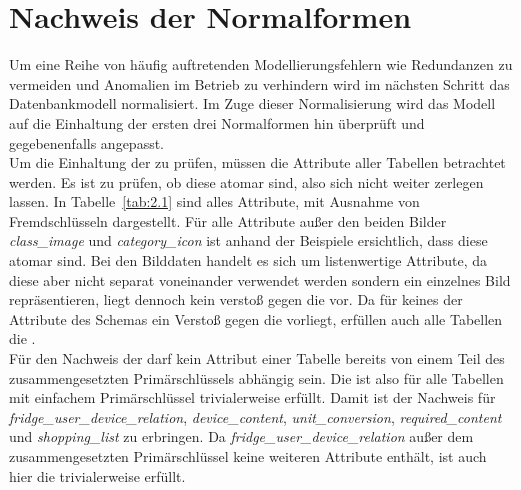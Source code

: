 \section{Nachweis der Normalformen}\label{sec:Nachweis der Normalformen}

Um eine Reihe von häufig auftretenden Modellierungsfehlern wie Redundanzen zu vermeiden und Anomalien im Betrieb zu verhindern wird im nächsten Schritt das Datenbankmodell normalisiert. Im Zuge dieser Normalisierung wird das Modell auf die Einhaltung der ersten drei Normalformen hin überprüft und gegebenenfalls angepasst.\\ Um die Einhaltung der  zu prüfen, müssen die Attribute aller Tabellen betrachtet werden. Es ist zu prüfen, ob diese atomar sind, also sich nicht weiter zerlegen lassen. In Tabelle~\ref{tab:2.1} sind alles Attribute, mit Ausnahme von Fremdschlüsseln dargestellt. Für alle Attribute außer den beiden Bilder \textit{class\_image} und \textit{category\_icon} ist anhand der Beispiele ersichtlich, dass diese atomar sind. Bei den Bilddaten handelt es sich um listenwertige Attribute, da diese aber nicht separat voneinander verwendet werden sondern ein einzelnes Bild repräsentieren, liegt dennoch kein verstoß gegen die  vor. Da für keines der Attribute des Schemas ein Verstoß gegen die  vorliegt, erfüllen auch alle Tabellen die .\\ Für den Nachweis der  darf kein Attribut einer Tabelle bereits von einem Teil des zusammengesetzten Primärschlüssels abhängig sein. Die  ist also für alle Tabellen mit einfachem Primärschlüssel trivialerweise erfüllt. Damit ist der Nachweis für \textit{fridge\_user\_device\_relation}, \textit{device\_content}, \textit{unit\_conversion}, \textit{required\_content} und \textit{shopping\_list} zu erbringen. Da \textit{fridge\_user\_device\_relation} außer dem zusammengesetzten Primärschlüssel keine weiteren Attribute enthält, ist auch hier die  trivialerweise erfüllt.
